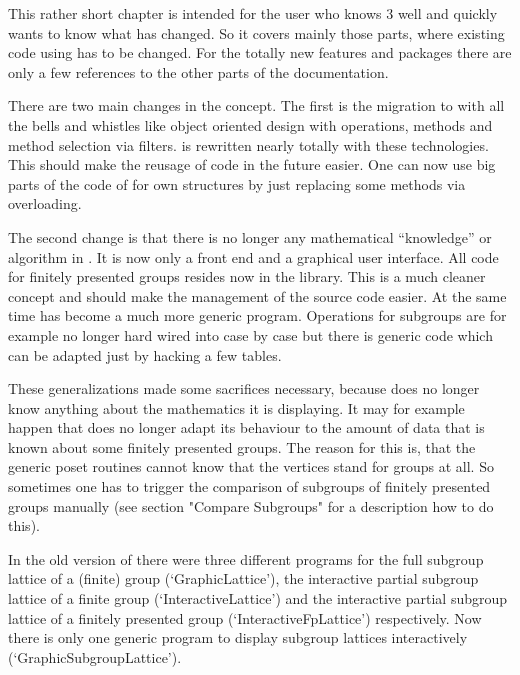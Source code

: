 
This rather short chapter is intended for the user who knows {\XGAP} 3 well
and quickly wants to know what has changed. So it covers mainly those
parts, where existing code using {\XGAP} has to be changed. For the totally 
new features and packages there are only a few references to the other
parts of the documentation.


There are two main changes in the concept. The first is the migration to
{} with all the bells and whistles like object oriented design with
operations, methods and method selection via filters. {} is rewritten 
nearly totally with these technologies. This should make the reusage of
code in the future easier. One can now use big parts of the code of {\XGAP}
for own structures by just replacing some methods via overloading.

The second change is that there is no longer any mathematical ``knowledge''
or algorithm in {\XGAP}. It is now only a front end and a graphical user
interface. All code for finitely presented groups resides now in the {\GAP}
library. This is a much cleaner concept and should make the management of
the source code easier. At the same time {\XGAP} has become a much more
generic program. Operations for subgroups are for example no longer hard
wired into {\XGAP} case by case but there is generic code which can be
adapted just by hacking a few tables.

These generalizations made some sacrifices necessary, because {\XGAP} does
no longer know anything about the mathematics it is displaying. It may for
example happen that {\XGAP} does no longer adapt its behaviour to the
amount of data that is known about some finitely presented groups. The
reason for this is, that the generic poset routines cannot know that the
vertices stand for groups at all. So sometimes one has to trigger the
comparison of subgroups of finitely presented groups manually (see section
"Compare Subgroups" for a description how to do this).

In the old {} version of {\XGAP} there were three different programs
for the full subgroup lattice of a (finite) group (`GraphicLattice'), the
interactive partial subgroup lattice of a finite group
(`InteractiveLattice') and the interactive partial subgroup lattice of a
finitely presented group (`InteractiveFpLattice') respectively. Now there
is only one generic program to display subgroup lattices interactively
(`GraphicSubgroupLattice').

